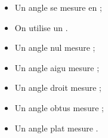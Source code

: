 \begin{mydef}
	\begin{itemize}
		\item Un angle se mesure en \hspace*{2cm};
		\item On utilise un \hspace*{2cm}.
		
	\end{itemize}
\end{mydef}

\begin{myexs}
	\begin{itemize}
		\item Un angle nul mesure \hspace*{1cm};
		\item Un angle aigu mesure \hspace*{3cm};
		\item Un angle droit mesure \hspace*{1cm};
		\item Un angle obtus mesure \hspace*{3cm};
		\item Un angle plat mesure \hspace*{1cm}.
	\end{itemize}
\end{myexs}